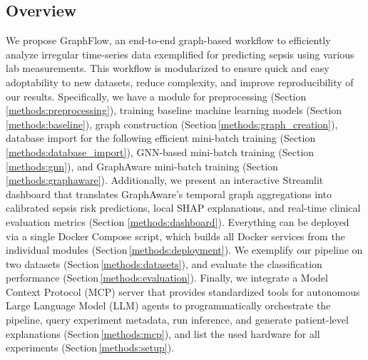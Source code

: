 \documentclass[pdflatex,sn-mathphys-num,lineno]{sn-jnl}
\theoremstyle{thmstyleone}%
\theoremstyle{thmstyletwo}%
\theoremstyle{thmstylethree}%
\begin{document}
\subsection{Overview}
We propose GraphFlow, an end-to-end graph-based workflow to efficiently analyze irregular time-series data exemplified for predicting sepsis using various lab measurements. This workflow is modularized to ensure quick and easy adoptability to new datasets, reduce complexity, and improve reproducibility of our results. Specifically, we have a module for preprocessing (Section\,\ref{methods:preprocessing}), training baseline machine learning models (Section\,\ref{methods:baseline}), graph construction (Section\,\ref{methods:graph_creation}), database import for the following efficient mini-batch training (Section\,\ref{methods:database_import}), GNN-based mini-batch training (Section\,\ref{methods:gnn}), and GraphAware mini-batch training (Section\,\ref{methods:graphaware}). Additionally, we present an interactive Streamlit dashboard that translates GraphAware's temporal graph aggregations into calibrated sepsis risk predictions, local SHAP explanations, and real-time clinical evaluation metrics (Section \ref{methods:dashboard}). Everything can be deployed via a single Docker Compose script, which builds all Docker services from the individual modules (Section\,\ref{methods:deployment}). We exemplify our pipeline on two datasets (Section\,\ref{methods:datasets}), and evaluate the classification performance (Section\,\ref{methods:evaluation}). Finally, we integrate a Model Context Protocol (MCP) server  \cite{modelcontextprotocol} that provides standardized tools for autonomous Large Language Model (LLM) agents to programmatically orchestrate the pipeline, query experiment metadata, run inference, and generate patient-level explanations (Section\,\ref{methods:mcp}), and list the used hardware for all experiments (Section\,\ref{methods:setup}).
\end{document}
